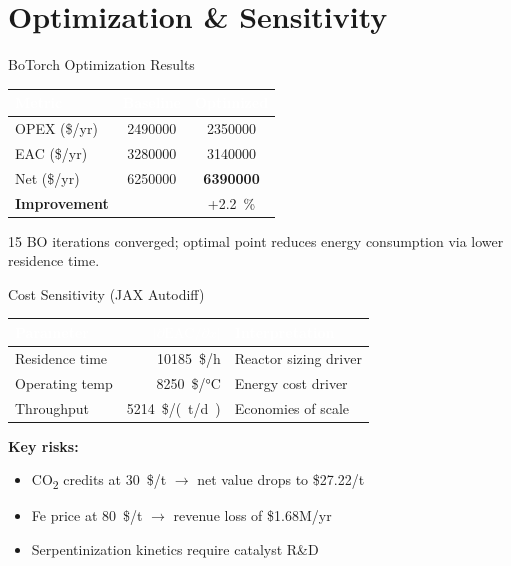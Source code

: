 \documentclass[aspectratio=169]{beamer}
\begin{document}
\section{Optimization \& Sensitivity}

\begin{frame}{BoTorch Optimization Results}
\begin{table}
\centering
\begin{tabular}{@{}lcc@{}}
\toprule
\textbf{\textcolor{white}{Metric}} & \textbf{\textcolor{white}{Baseline}} & \textbf{\textcolor{white}{Optimized}} \\
\midrule
OPEX (\$/yr) & \num{2490000} & \num{2350000} \\
EAC (\$/yr)  & \num{3280000} & \num{3140000} \\
Net (\$/yr)  & \num{6250000} & \textcolor{StepGreen}{\textbf{\num{6390000}}} \\
\midrule
\textbf{Improvement} & & \textcolor{StepGreen}{+\SI{2.2}{\percent}} \\
\bottomrule
\end{tabular}
\end{table}
\vspace{8pt}
\centering
\small 15 BO iterations converged; optimal point reduces energy consumption via lower residence time.
\end{frame}

\begin{frame}{Cost Sensitivity (JAX Autodiff)}
\begin{table}
\centering
\begin{tabular}{@{}lrl@{}}
\toprule
\textbf{\textcolor{white}{Parameter}} & \textbf{\textcolor{white}{$|\partial\text{EAC}/\partial x|$}} & \textbf{\textcolor{white}{Interpretation}} \\
\midrule
Residence time & \SI{10185}{\$/h}  & Reactor sizing driver \\
Operating temp & \SI{8250}{\$/\degreeCelsius} & Energy cost driver \\
Throughput     & \SI{5214}{\$/(t/d)} & Economies of scale \\
\bottomrule
\end{tabular}
\end{table}
\vspace{10pt}
\textbf{Key risks:}
\begin{itemize}
    \item CO\textsubscript{2} credits at \SI{30}{\$/t} $\to$ net value drops to \$27.22/t
    \item Fe price at \SI{80}{\$/t} $\to$ revenue loss of \$1.68M/yr
    \item Serpentinization kinetics require catalyst R\&D
\end{itemize}
\end{frame}
\end{document}
